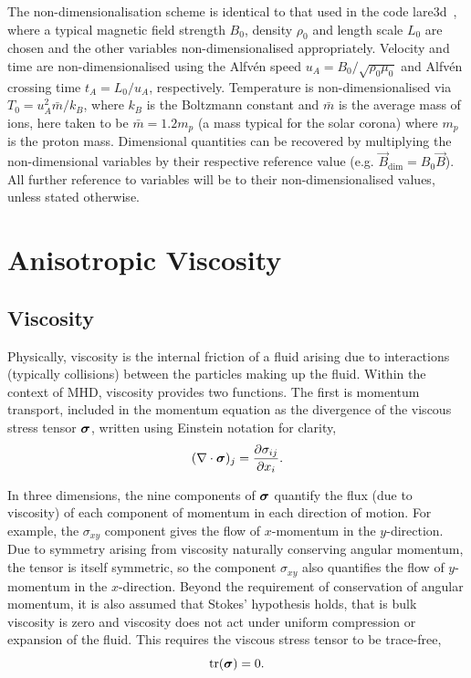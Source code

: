 The non-dimensionalisation scheme is identical to that used in the code lare3d~\cite{arberStaggeredGridLagrangian2001}, where a typical magnetic field strength $B_0$, density $\rho_0$ and length scale $L_0$ are chosen and the other variables non-dimensionalised appropriately. Velocity and time are
non-dimensionalised using the Alfv\'en speed $u_A = B_0 / \sqrt{\rho_0
  \mu_0}$ and Alfv\'en crossing time $t_A = L_0/u_A$,
respectively. Temperature is non-dimensionalised via $T_0 = u_A^2
\bar{m} / k_B$, where $k_B$ is the Boltzmann constant and $\bar{m}$ is
the average mass of ions, here taken to be $\bar{m} = 1.2m_p$ (a mass
typical for the solar corona) where $m_p$ is the proton mass. Dimensional quantities can be recovered by multiplying the non-dimensional variables by their respective reference value (e.g. $\vec{B}_{\dim} = B_0 \vec{B}$). All further reference to variables will be to their non-dimensionalised values, unless stated otherwise.

\section{Anisotropic Viscosity}

\subsection{Viscosity}

Physically, viscosity is the internal friction of a fluid arising due to interactions (typically collisions) between the particles making up the fluid. Within the context of MHD, viscosity provides two functions. The first is momentum transport, included in the momentum equation as the divergence of the viscous stress tensor ${\bm \sigma}$, written using Einstein notation for clarity,
\begin{equation}
  \label{eq:viscous_momenum_transport}
  (\nabla \cdot {\bm \sigma})_j = \frac{\partial \sigma_{ij}}{\partial x_i}.
\end{equation}

In three dimensions, the nine components of ${\bm \sigma}$ quantify the flux (due to viscosity) of each component of momentum in each direction of motion. For example, the $\sigma_{xy}$ component gives the flow of $x$-momentum in the $y$-direction. Due to symmetry arising from viscosity naturally conserving angular momentum, the tensor is itself symmetric, so the component $\sigma_{xy}$ also quantifies the flow of $y$-momentum in the $x$-direction. Beyond the requirement of conservation of angular momentum, it is also assumed that Stokes' hypothesis holds, that is bulk viscosity is zero and viscosity does not act under uniform compression or expansion of the fluid. This requires the viscous stress tensor to be trace-free,
\begin{equation}
  \label{eq:trace_free_tensor}
  \text{tr}({\bm \sigma}) = 0.
\end{equation}


